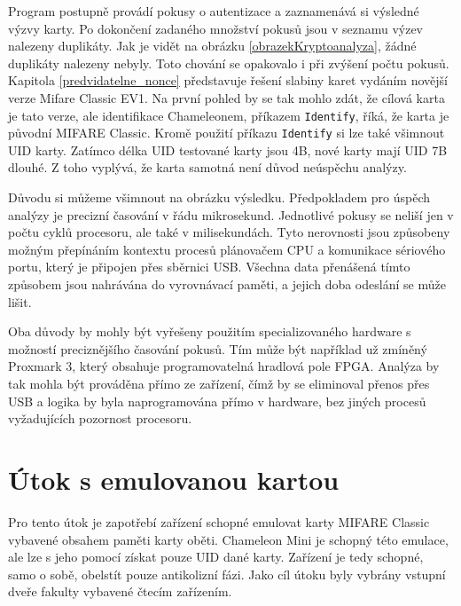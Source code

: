 Program postupně provádí pokusy o autentizace a zaznamenává si výsledné výzvy karty. Po dokončení zadaného množství pokusů jsou v seznamu výzev nalezeny duplikáty. Jak je vidět na obrázku \ref{obrazekKryptoanalyza}, žádné duplikáty nalezeny nebyly. Toto chování se opakovalo i při zvýšení počtu pokusů. Kapitola \ref{predvidatelne_nonce} představuje řešení slabiny karet vydáním novější verze Mifare Classic EV1. Na první pohled by se tak mohlo zdát, že cílová karta je tato verze, ale identifikace Chameleonem, příkazem \verb|Identify|, říká, že karta je původní MIFARE Classic. Kromě použití příkazu \verb|Identify| si lze také všimnout UID karty. Zatímco délka UID testované karty jsou 4B, nové karty mají UID 7B dlouhé\cite{MIFARE_Classic_Official_about}. Z toho vyplývá, že karta samotná není důvod neúspěchu analýzy.\par
Důvodu si můžeme všimnout na obrázku výsledku. Předpokladem pro úspěch analýzy je precizní časování v řádu mikrosekund. Jednotlivé pokusy se neliší jen v počtu cyklů procesoru, ale také v milisekundách. Tyto nerovnosti jsou způsobeny možným přepínáním kontextu procesů plánovačem CPU a komunikace sériového portu, který je připojen přes sběrnici USB. Všechna data přenášená tímto způsobem jsou nahrávána do vyrovnávací paměti, a jejich doba odeslání se může lišit\cite{RelayUtokBP}.\par
Oba důvody by mohly být vyřešeny použitím specializovaného hardware s možností preciznějšího časování pokusů. Tím může být například už zmíněný Proxmark 3, který obsahuje programovatelná hradlová pole FPGA\cite{Proxmark}. Analýza by tak mohla být prováděna přímo ze zařízení, čímž by se eliminoval přenos přes USB a logika by byla naprogramována přímo v hardware, bez jiných procesů vyžadujících pozornost procesoru.

\section{Útok s emulovanou kartou}
Pro tento útok je zapotřebí zařízení schopné emulovat karty MIFARE Classic vybavené obsahem paměti karty oběti. Chameleon Mini je schopný této emulace, ale lze s jeho pomocí získat pouze UID dané karty. Zařízení je tedy schopné, samo o sobě, obelstít pouze antikolizní fázi. Jako cíl útoku byly vybrány vstupní dveře fakulty vybavené čtecím zařízením. \par

